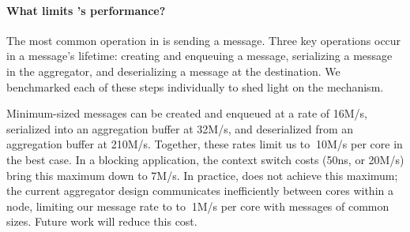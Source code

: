 \paragraph{What limits \Grappa's performance?}
The most common operation in \Grappa is sending a message. Three key
operations occur in a message's lifetime: creating and enqueuing a
message, serializing a message in the aggregator, and deserializing a
message at the destination. We benchmarked each of these steps
individually to shed light on the mechanism.

Minimum-sized messages can be created and enqueued at a rate of 16M/s,
serialized into an aggregation buffer at 32M/s, and deserialized from
an aggregation buffer at 210M/s.  Together, these rates limit us to
$~$10M/s per core in the best case. In a blocking application, the
context switch costs (50ns, or 20M/s) bring this maximum down to
7M/s. In practice, \Grappa does not achieve this maximum; the current
aggregator design communicates inefficiently between cores within a
node, limiting our message rate to to $~$1M/s per core with messages
of common sizes. Future work will reduce this cost.  







